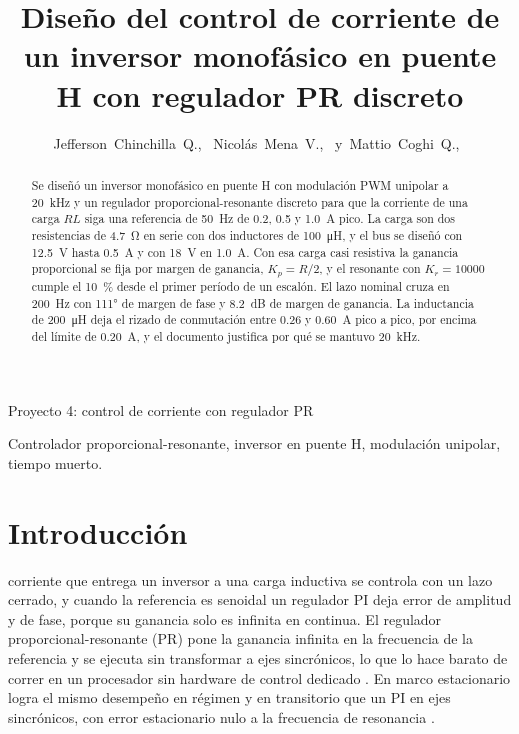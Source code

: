 \documentclass[journal]{IEEEtran}
\begin{document}
\deactivatequoting
\title{Diseño del control de corriente de un inversor monofásico en puente H con regulador PR discreto}

\author{Jefferson~Chinchilla~Q.,~
	Nicolás~Mena~V.,~
	y~Mattio~Coghi~Q.,~
}

%
{Proyecto 4: control de corriente con regulador PR}

\maketitle

\begin{abstract}
	Se diseñó un inversor monofásico en puente H con modulación PWM unipolar a \SI{20}{kHz} y un regulador proporcional-resonante discreto para que la corriente de una carga $RL$ siga una referencia de \SI{50}{Hz} de \num{0.2}, \num{0.5} y \SI{1.0}{A} pico. La carga son dos resistencias de \SI{4.7}{\ohm} en serie con dos inductores de \SI{100}{\micro H}, y el bus se diseñó con \SI{12.5}{V} hasta \SI{0.5}{A} y con \SI{18}{V} en \SI{1.0}{A}. Con esa carga casi resistiva la ganancia proporcional se fija por margen de ganancia, $K_p=R/2$, y el resonante con $K_r=\num{10000}$ cumple el \SI{10}{\percent} desde el primer período de un escalón. El lazo nominal cruza en \SI{200}{Hz} con \ang{111} de margen de fase y \SI{8.2}{dB} de margen de ganancia. La inductancia de \SI{200}{\micro H} deja el rizado de conmutación entre \num{0.26} y \SI{0.60}{A} pico a pico, por encima del límite de \SI{0.20}{A}, y el documento justifica por qué se mantuvo \SI{20}{kHz}.
\end{abstract}

\begin{IEEEkeywords}
	Controlador proporcional-resonante, inversor en puente H, modulación unipolar, tiempo muerto.
\end{IEEEkeywords}

\section{Introducción}
\label{sec:intro}
 corriente que entrega un inversor a una carga inductiva se controla con un lazo cerrado, y cuando la referencia es senoidal un regulador PI deja error de amplitud y de fase, porque su ganancia solo es infinita en continua. El regulador proporcional-resonante (PR) pone la ganancia infinita en la frecuencia de la referencia y se ejecuta sin transformar a ejes sincrónicos, lo que lo hace barato de correr en un procesador sin hardware de control dedicado \cite{teodorescu2006}. En marco estacionario logra el mismo desempeño en régimen y en transitorio que un PI en ejes sincrónicos, con error estacionario nulo a la frecuencia de resonancia \cite{zmood2003}.
\end{document}
